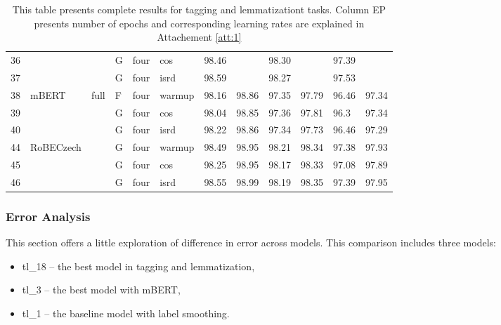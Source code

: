\begin{table}[!h]
{\begin{tabular}{|l|l|l|l|l|l||llllll|}
36 &                              &                         & G	& four                     & cos    & 98.46  &         & 98.30   &          & 97.39     &            \\ \cline{1-1} \cline{4-12}
37 &                              &                         & G	& four                     & isrd   & 98.59  &         & 98.27   &          & 97.53     &            \\ \hline
38 & \multirow{3}{*}{mBERT}       & \multirow{9}{*}{full}   & F	& four                     & warmup & 98.16  & 98.86   & 97.35   & 97.79    & 96.46     & 97.34      \\ \cline{1-1} \cline{4-12}
39 &                              &                         & G	& four                     & cos    & 98.04  & 98.85   & 97.36   & 97.81    & 96.3      & 97.34      \\ \cline{1-1} \cline{4-12}
40 &                              &                         & G	& four                     & isrd   & 98.22  & 98.86   & 97.34   & 97.73    & 96.46     & 97.29      \\ \cline{1-2} \cline{4-12}
44 & \multirow{3}{*}{RoBECzech}   &                         & G	& four                     & warmup & 98.49  & 98.95   & 98.21   & 98.34    & 97.38     & 97.93      \\ \cline{1-1} \cline{4-12}
45 &                              &                         & G	& four                     & cos    & 98.25  & 98.95   & 98.17   & 98.33    & 97.08     & 97.89      \\ \cline{1-1} \cline{4-12}
46 &                              &                         & G	& four                     & isrd   & 98.55  & 98.99   & 98.19   & 98.35    & 97.39     & 97.95      \\ \hline

\end{tabular}
}
\caption{This table presents complete results for tagging and lemmatizationt tasks. Column EP presents number of epochs and corresponding learning rates are explained in Attachement \protect\ref{att:1} }
\label{tab:all_res_tl}
\end{table}

\subsubsection{Error Analysis}
This section offers a little exploration of difference in error across models. This comparison includes three models: 
\begin{itemize}
\item tl\_18 -- the best model in tagging and lemmatization,
\item tl\_3 -- the best model with mBERT,
\item tl\_1 -- the baseline model with label smoothing.
\end{itemize} 

